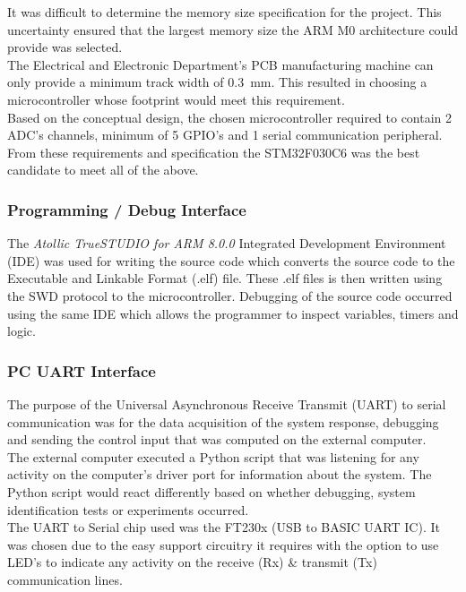 It was difficult to determine the memory size specification for the project. This uncertainty ensured that the largest memory size the ARM M0 architecture could provide was selected.\\

The Electrical and Electronic Department's PCB manufacturing machine can only provide a  minimum track width of \SI{0.3}{mm}. This resulted in choosing a microcontroller whose footprint would meet this requirement.\\

Based on the conceptual design, the chosen microcontroller required to contain 2 ADC's channels, minimum of 5 GPIO's and 1 serial communication peripheral.\\

From these requirements and specification the STM32F030C6 was the best candidate to meet all of the above.

\subsubsection{Programming / Debug Interface}
The \textit{Atollic TrueSTUDIO for ARM 8.0.0} Integrated Development Environment (IDE) was used for writing the source code which converts the source code to the Executable and Linkable Format (.elf) file. These .elf files is then written using the SWD protocol to the microcontroller. Debugging of the source code occurred using the same IDE which allows the programmer to inspect variables, timers and logic.

\subsubsection{PC UART Interface }

The purpose of the Universal Asynchronous Receive Transmit (UART) to serial communication was for the data acquisition of the system response, debugging and sending the control input that was computed on the external computer.\\

The external computer executed a Python script that was listening for any activity on the computer's driver port for information about the system. The Python script would react differently based on whether debugging, system identification tests or experiments occurred.\\

The UART to Serial chip used was the FT230x (USB to BASIC UART IC). It was chosen due to the easy support circuitry it requires with the option to use LED's to indicate any activity on the receive (Rx)  \& transmit (Tx) communication lines.\\

